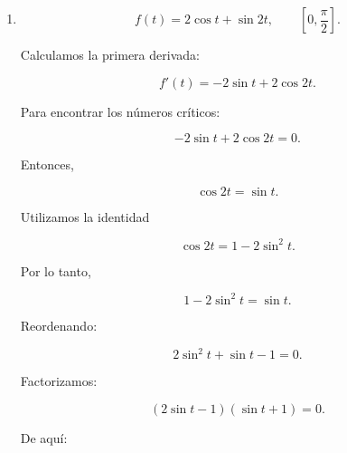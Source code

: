 \documentclass[12pt]{article}
\begin{document}
\begin{enumerate}[label=\alph*.-]
\begin{enumerate}[label=\roman*.-]
    y

    \[
    t=\pm\sqrt2.
    \]

    Como el intervalo es $[-1,2]$, solamente

    \[
    t=\sqrt2
    \]

    pertenece al intervalo.

    Evaluamos en los extremos y en el número crítico:

    \[
    f(-1)
    =
    (-1)\sqrt{4-1}
    =
    -\sqrt3,
    \]

    \[
    f(\sqrt2)
    =
    \sqrt2\sqrt{4-2}
    =
    2,
    \]

    \[
    f(2)
    =
    2\sqrt{4-4}
    =
    0.
    \]

    Como

    \[
    2>0>-\sqrt3,
    \]

    tenemos:

    \[
    \boxed{
    \text{Máximo absoluto: }(\sqrt2,2)
    }
    \]

    y

    \[
    \boxed{
    \text{Mínimo absoluto: }(-1,-\sqrt3)
    }.
    \]

				\newpage

    \item
    \[
    f(t)=2\cos t+\sin 2t,
    \qquad
    \left[0,\frac{\pi}{2}\right].
    \]

    Calculamos la primera derivada:

    \[
    f'(t)=-2\sin t+2\cos2t.
    \]

    Para encontrar los números críticos:

    \[
    -2\sin t+2\cos2t=0.
    \]

    Entonces,

    \[
    \cos2t=\sin t.
    \]

    Utilizamos la identidad

    \[
    \cos2t=1-2\sin^2t.
    \]

    Por lo tanto,

    \[
    1-2\sin^2t=\sin t.
    \]

    Reordenando:

    \[
    2\sin^2t+\sin t-1=0.
    \]

    Factorizamos:

    \[
    (2\sin t-1)(\sin t+1)=0.
    \]

    De aquí:


\end{enumerate}
\end{enumerate}
\end{document}
